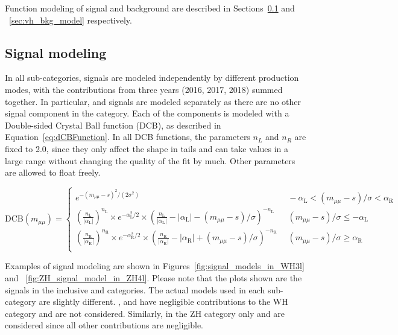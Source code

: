 Function modeling of signal and background are described in Sections~\ref{sec:vh_sig_model} and ~\ref{sec:vh_bkg_model} respectively.

\subsection{Signal modeling}\label{sec:vh_sig_model}
In all sub-categories, signals are modeled independently by different production modes,
with the contributions from three years (2016, 2017, 2018) summed together. 
In particular, \qqZH and \ggZH signals are modeled separately as there are no other signal component in the \ZH category.
Each of the components is modeled with a Double-sided Crystal Ball function (DCB), as described in Equation~\ref{eq:dCBFunction}.  
In all DCB functions, the parameters $n_L$ and $n_R$ are fixed to 2.0, 
since they only affect the shape in tails and can take values in a large range without changing the quality of the fit by much. 
Other parameters are allowed to float freely.  

\begin{equation}
  \label{eq:dCBFunction}
  \text{DCB}(m_{\mu\mu})=%
    \begin{cases}
        e^{-(m_{\mu\mu} - s)^{2}/(2\sigma^{2})} & \ \ -\alpha_{\mathrm{L}} < (m_{\mu\mu}-s)/\sigma < \alpha_{\mathrm{R}} \\
        (\frac{n_{\mathrm{L}}}{|\alpha_{\mathrm{L}}|})^{n_{\mathrm{L}}} \times e^{-\alpha^{2}_{\mathrm{L}}/2} \times (\frac{n_{\mathrm{L}}}{|\alpha_{\mathrm{L}}|} - |\alpha_{\mathrm{L}}| - (m_{\mu\mu}-s)/\sigma)^{-n_{\mathrm{L}}}
        & \ \ (m_{\mu\mu}-s)/\sigma \leq -\alpha_{\mathrm{L}} \\
        (\frac{n_{\mathrm{R}}}{|\alpha_{\mathrm{R}}|})^{n_{\mathrm{R}}} \times e^{-\alpha^{2}_{\mathrm{R}}/2} \times (\frac{n_{\mathrm{R}}}{|\alpha_{\mathrm{R}}|} - |\alpha_{\mathrm{R}}| + (m_{\mu\mu}-s)/\sigma)^{-n_{\mathrm{R}}}
        & \ \ (m_{\mu\mu}-s)/\sigma \geq \alpha_{\mathrm{R}} \\
    \end{cases}
\end{equation}

Examples of signal modeling are shown in Figures~\ref{fig:signal_models_in_WH3l} and ~\ref{fig:ZH_signal_model_in_ZH4l}. 
Please note that the plots shown are the signals in the inclusive \WH and \ZH categories. 
The actual models used in each sub-category are slightly different. 
\ggH, \qqH and \bbH have negligible contributions to the WH category and are not considered.  
Similarly, in the ZH category only \qqZH and \ggZH are considered since all other contributions are negligible. 

